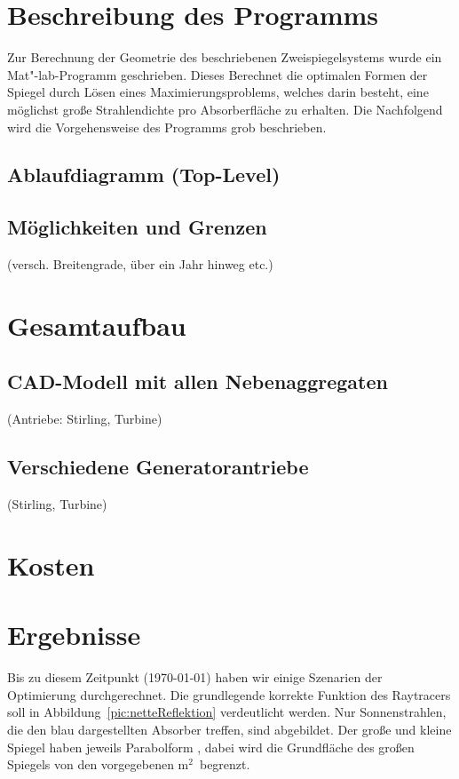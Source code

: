 \documentclass[fontsize=10pt,paper=a4,bibliography=totoc]{scrartcl}
\newcommand{\maxim}[1]{{ \color{blue} #1}}
\begin{document}
\section{Beschreibung des Programms}
\maxim{
Zur Berechnung der Geometrie des beschriebenen Zweispiegelsystems wurde ein Mat"-lab-Programm geschrieben. Dieses Berechnet die optimalen Formen der Spiegel durch Lösen eines Maximierungsproblems, welches darin besteht, eine möglichst große Strahlendichte pro Absorberfläche zu erhalten. Die 
Nachfolgend wird die Vorgehensweise des Programms grob beschrieben.
}
\subsection{Ablaufdiagramm (Top-Level)}
\maxim{

}
\subsection{Möglichkeiten und Grenzen}
 (versch. Breitengrade, über ein Jahr hinweg etc.)
\section{Gesamtaufbau}
\subsection{CAD-Modell mit allen Nebenaggregaten}
 (Antriebe: Stirling, Turbine)
\subsection{Verschiedene Generatorantriebe}
 (Stirling, Turbine)
\section{Kosten}

\section{Ergebnisse}
Bis zu diesem Zeitpunkt (\today) haben wir einige Szenarien der Optimierung durchgerechnet. Die grundlegende korrekte Funktion des Raytracers soll in Abbildung~\ref{pic:netteReflektion} verdeutlicht werden. Nur Sonnenstrahlen, die den blau dargestellten Absorber treffen, sind abgebildet. Der große und kleine Spiegel haben jeweils Parabolform , dabei wird die Grundfläche des großen Spiegels von den vorgegebenen \unit[10]{m$^2$} begrenzt.
\end{document}
